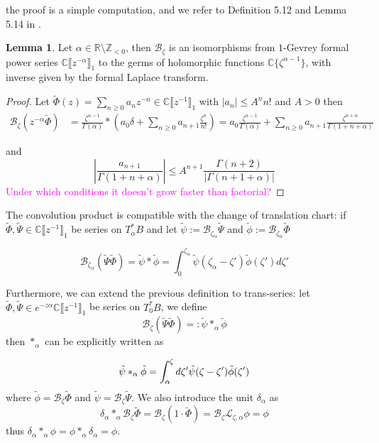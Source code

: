 \documentclass{article}
\theoremstyle{definition}
\newcommand{\Z}{\mathbb{Z}}
\newcommand{\C}{\mathbb{C}}
\newcommand{\series}[1]{\tilde{#1}}
\newcommand{\laplace}{\mathcal{L}}
\newcommand{\borel}{\mathcal{B}}
\newtheorem{lemma}[definition]{Lemma}
\begin{document}
the proof is a simple computation, and we refer to Definition 5.12 and Lemma 5.14 in \cite{diverg-resurg-i}.
\begin{lemma}
    Let $\alpha\in\mathbb{R}\setminus\Z_{<0}$, then $\borel_\zeta$ is an isomorphisms from $1$-Gevrey formal power series $\C \llbracket z^{-\alpha} \rrbracket_1$ to the germs of holomorphic functions $\C \lbrace \zeta^{\alpha-1} \rbrace$, with inverse given by the formal Laplace transform.
\end{lemma}
\begin{proof}
    Let $\tilde{\Phi}(z)=\sum_{n\geq 0}a_nz^{-n}\in\C \llbracket z^{-1} \rrbracket_1$ with $|a_n|\leq A^n n!$ and $A>0$ then  
\begin{align*}
\borel_\zeta (z^{-\alpha}\tilde{\Phi})&=\frac{\zeta^{\alpha-1}}{\Gamma(\alpha)}\ast\left(a_0\delta+\sum_{n\geq 0}a_{n+1}\frac{\zeta^n}{n!}\right)=a_0\frac{\zeta^{\alpha-1}}{\Gamma(\alpha)}+\sum_{n\geq 0}a_{n+1}\frac{\zeta^{n+\alpha}}{\Gamma(1+n+\alpha)}
\end{align*}  

and \[\left|\frac{a_{n+1}}{\Gamma(1+n+\alpha)}\right|\leq A^{n+1}\frac{\Gamma(n+2)}{|\Gamma(n+1+\alpha)|} \]
\textcolor{magenta}{Under which conditions it doesn't grow faster than factorial?}
\end{proof}


The convolution product is compatible with the change of translation chart: if $\tilde{\Phi}, \tilde{\Psi}\in \C \llbracket z^{-1} \rrbracket_1$ be series on $T^*_\alpha B$ and let $\series{\psi}:=\borel_{\zeta_\alpha}\series{\Psi}$ and $\series{\phi}:=\borel_{\zeta_\alpha}\series{\Phi}$

\[\borel_{\zeta_\alpha}(\series{\Psi}\series{\Phi})=\series{\psi}\ast \series{\phi}=\int_{0}^{\zeta_\alpha}\series{\psi}(\zeta_\alpha-\zeta')\series{\phi}(\zeta')d\zeta'\]

Furthermore, we can extend the previous definition to trans-series: let $\tilde{\Phi}, \tilde{\Psi}\in e^{-z\alpha}\C \llbracket z^{-1} \rrbracket_1$ be series on $T^*_0 B$, we define  \[\borel_{\zeta}(\series{\Psi}\series{\Phi})=:\series{\psi}\ast_\alpha\series{\phi}\]
then $\ast_\alpha$ can be explicitly written as 

\begin{equation}
    \tilde{\psi}\ast_\alpha\Tilde{\phi}=\int_\alpha^{\zeta}d\zeta' \tilde{\psi}(\zeta-\zeta')\tilde{\phi}(\zeta')
\end{equation}
where $\series{\phi}=\borel_\zeta\series{\Phi}$ and $\series{\psi}=\borel_\zeta\series{\Psi}$. We also introduce the unit $\delta_\alpha$ as \[\delta_\alpha\ast_\alpha\borel_\zeta\series{\Phi}=\borel_\zeta(1\cdot\series{\Phi})=\borel_\zeta\laplace_{\zeta,\alpha}\phi=\phi\]
thus $\delta_\alpha\ast_\alpha\phi=\phi\ast_\alpha\delta_\alpha=\phi$. 
\end{document}
